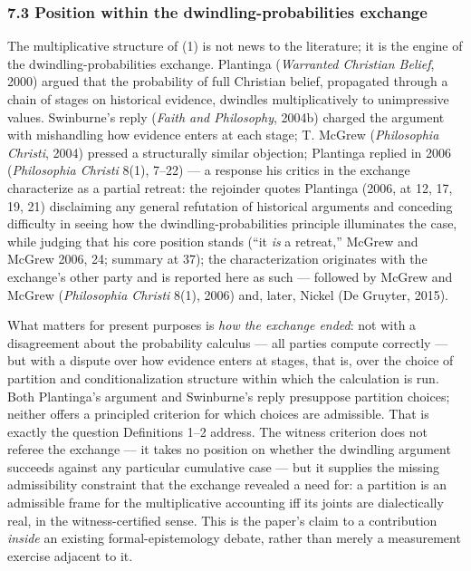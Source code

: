 \subsubsection{7.3 Position within the dwindling-probabilities exchange}\label{position-within-the-dwindling-probabilities-exchange}

The multiplicative structure of (1) is not news to the literature; it is the engine of the dwindling-probabilities exchange. Plantinga (\emph{Warranted Christian Belief}, 2000) argued that the probability of full Christian belief, propagated through a chain of stages on historical evidence, dwindles multiplicatively to unimpressive values. Swinburne's reply (\emph{Faith and Philosophy}, 2004b) charged the argument with mishandling how evidence enters at each stage; T. McGrew (\emph{Philosophia Christi}, 2004) pressed a structurally similar objection; Plantinga replied in 2006 (\emph{Philosophia Christi} 8(1), 7--22) --- a response his critics in the exchange characterize as a partial retreat: the rejoinder quotes Plantinga (2006, at 12, 17, 19, 21) disclaiming any general refutation of historical arguments and conceding difficulty in seeing how the dwindling-probabilities principle illuminates the case, while judging that his core position stands (``it \emph{is} a retreat,'' McGrew and McGrew 2006, 24; summary at 37); the characterization originates with the exchange's other party and is reported here as such --- followed by McGrew and McGrew (\emph{Philosophia Christi} 8(1), 2006) and, later, Nickel (De Gruyter, 2015).

What matters for present purposes is \emph{how the exchange ended}: not with a disagreement about the probability calculus --- all parties compute correctly --- but with a dispute over how evidence enters at stages, that is, over the choice of partition and conditionalization structure within which the calculation is run. Both Plantinga's argument and Swinburne's reply presuppose partition choices; neither offers a principled criterion for which choices are admissible. That is exactly the question Definitions 1--2 address. The witness criterion does not referee the exchange --- it takes no position on whether the dwindling argument succeeds against any particular cumulative case --- but it supplies the missing admissibility constraint that the exchange revealed a need for: a partition is an admissible frame for the multiplicative accounting iff its joints are dialectically real, in the witness-certified sense. This is the paper's claim to a contribution \emph{inside} an existing formal-epistemology debate, rather than merely a measurement exercise adjacent to it.

